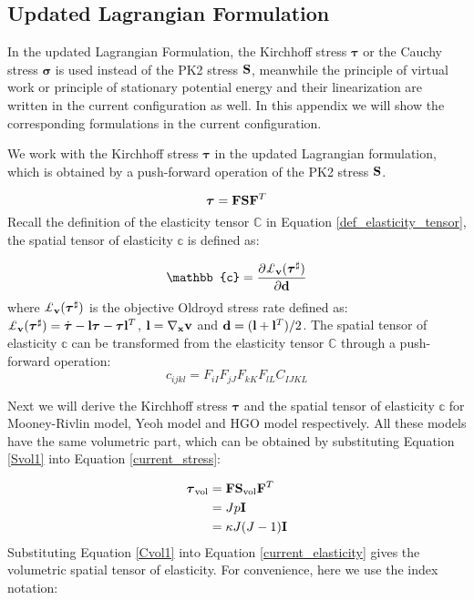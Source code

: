 \begin{appendices}
\section{Updated Lagrangian Formulation}
In the updated Lagrangian Formulation, the Kirchhoff stress $\boldsymbol{\tau}$ or the Cauchy stress $\boldsymbol{\sigma}$ is used instead of the PK2 stress $\bold{S}$, meanwhile the principle of virtual work or principle of stationary potential energy and their linearization are written in the current configuration as well. In this appendix we will show the corresponding formulations in the current configuration.

%
We work with the Kirchhoff stress $\boldsymbol{\tau}$ in the updated Lagrangian formulation, which is obtained by a push-forward operation of the PK2 stress $\bold{S}$.

\begin{equation}
\boldsymbol{\tau} = \bold{F}\bold{S}{\bold{F}}^T \label{current_stress}
\end{equation}
Recall the definition of the elasticity tensor $\mathbb{C}$ in Equation \ref{def_elasticity_tensor}, the spatial tensor of elasticity $\mathbb{c}$ is defined as:

\begin{equation}
\mathbb{c} = \frac{\partial{ \pounds_{\bold{v}}({\boldsymbol{\tau}}^{\sharp}) } }{\partial{ \bold{d} }}
\end{equation} 
where $\pounds_{\bold{v}}({\boldsymbol{\tau}}^{\sharp})$ is the objective Oldroyd stress rate defined as: $\pounds_{\bold{v}}({\boldsymbol{\tau}}^{\sharp}) = \dot{\boldsymbol{\tau}} - \bold{l}\boldsymbol{\tau} - \boldsymbol{\tau}\bold{l}^T$, $\bold{l} = \nabla_{\bold{x}}\bold{v}$ and $\bold{d} = (\bold{l} + {\bold{l}}^T)/2$. 
The spatial tensor of elasticity $\mathbb{c}$ can be transformed from the elasticity tensor $\mathbb{C}$ through a push-forward operation:
\begin{equation}
c_{ijkl} = F_{iI}F_{jJ}F_{kK}F_{lL}C_{IJKL} \label{current_elasticity}
\end{equation}

Next we will derive the Kirchhoff stress $\boldsymbol{\tau}$ and the spatial tensor of elasticity $\mathbb{c}$ for Mooney-Rivlin model, Yeoh model and HGO model respectively. All these models have the same volumetric part, which can be obtained by substituting Equation \ref{Svol1} into Equation \ref{current_stress}:

\begin{subequations}
\label{Tauvol1}
\begin{align}
\boldsymbol{\tau}_\mathrm{vol} &= \bold{F}\bold{S}_\mathrm{vol}{\bold{F}}^T \\
				    &= Jp\bold{I} \label{Tauvol11}\\
		      		    &= \kappa J(J-1) \bold{I} \label{Tauvol12}
\end{align}
\end{subequations}
Substituting Equation \ref{Cvol1} into Equation \ref{current_elasticity} gives the volumetric spatial tensor of elasticity. For convenience, here we use the index notation:


\end{appendices}
